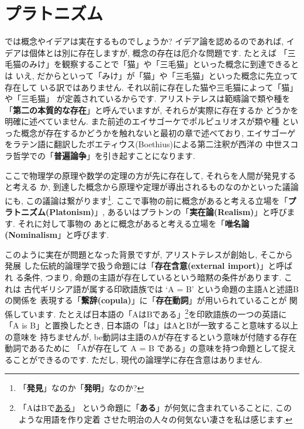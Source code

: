 \section{プラトニズム}


では概念やイデアは実在するものでしょうか? イデア論を認めるのであれば,
 イデアは個体とは別に存在しますが, 概念の存在は厄介な問題です. たとえば
「三毛猫のみけ」を観察することで「猫」や「三毛猫」といった概念に到達できるとは
いえ, だからといって「みけ」が「猫」や「三毛猫」といった概念に先立って存在して
いる訳ではありません. それ以前に存在した猫や三毛猫によって「猫」や「三毛猫」
が定義されているからです. アリストテレスは範疇論で類や種を
「\textbf{第二の本質的な存在}」と呼んでいますが, それらが実際に存在するか
どうかを明確に述べていません. また前述のエイサゴーケでポルピュリオスが類や種
といった概念が存在するかどうかを触れないと最初の章で述べており, エイサゴーゲ
をラテン語に翻訳したボエティウス(Boethius)による第二注釈が西洋の
中世スコラ哲学での「\textbf{普遍論争}」を引き起すことになります\cite{普遍論争}.
\newline


ここで物理学の原理や数学の定理の方が先に存在して, それらを人間が発見すると考える
か, 到達した概念から原理や定理が導出されるものなのかといった議論にも,
 この議論は繋がります\footnote{「\textbf{発見}」なのか「\textbf{発明}」なのか?}.
 ここで事物の前に概念があると考える立場を「\textbf{プラトニズム(Platonism)}」,
 あるいはプラトンの「\textbf{実在論(Realism)}」と呼びます. それに対して事物の
あとに概念があると考える立場を「\textbf{唯名論(Nominalism}」と呼びます.
\newline


このように実在が問題となった背景ですが, アリストテレスが創始し, そこから発展
した伝統的論理学で扱う命題には「\textbf{存在含意(external import)}」と呼ばれ
る条件, つまり, 命題の主語が存在しているという暗黙の条件があります. これは
古代ギリシア語が属する印欧語族では `A = B' という命題の主語Aと述語Bの関係を
表現する「\textbf{繋辞(copula)}」に「\textbf{存在動詞}」が用いられていることが
関係しています. たとえば日本語の「AはBである」\footnote{「AはBで\underline{ある}」
という命題に「\textbf{ある}」が何気に含まれていることに, このような用語を作り定着
させた明治の人々の何気ない凄さを私は感じます.}を印欧語族の一つの英語に
「A is B」と置換したとき, 日本語の「は」はAとBが一致すること意味する以上の意味を
持ちませんが, be動詞は主語のAが存在するという意味が付随する存在動詞であるために
「Aが存在して A = B である」の意味を持つ命題として捉えることができるのです.
 ただし, 現代の論理学に存在含意はありません.
\newline 

